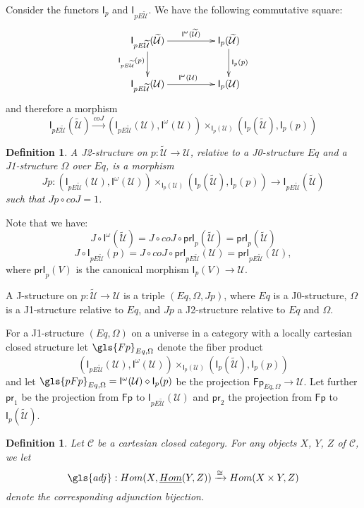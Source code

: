 \documentclass[12pt]{article}
\numberwithin{equation}{section}
\newenvironment{eq}{\begin{equation}}{\end{equation}}
\newtheorem{definition}[proposition]{Definition}
\newcommand{\sr}{\rightarrow}
\newcommand{\lr}{\longrightarrow}
\newcommand{\uu}{\underline}
\newcommand{\iHom}{\uu{Hom}}
\newcommand{\wt}{\widetilde}
\newcommand{\dd}{\diamond}
\newcommand{\C}{{\mathcal C}}  %
\newcommand{\id}{1}            %
\newcommand{\U}{\mathcal{U}}
\newcommand{\I}{\mathsf{I}}
\newcommand{\Fp}{\mathsf{Fp}}
\newcommand{\pr}{\mathsf{pr}}
\newcommand{\prI}{\mathsf{prI}}
\begin{document}
Consider the functors $\I_{p}$ and $\I_{pE\wt{\U}}$. We have the following
commutative square:
%
\begin{eq}\label{2010.sq1}
\begin{xy}
          \xymatrix@C=4pc{ \I_{pE\wt{\U}}(\wt{\U}) \ar[r]^-{\I^{\omega}(\wt{\U})}
            \ar[d]_{\I_{pE\wt{\U}}(p)} & \I_p(\wt{\U})
            \ar[d]^{\I_p(p)}\\ \I_{pE\wt{\U}}(\U) \ar[r]^{\I^{\omega}(\U)} & \I_p(\U) }
\end{xy}
\end{eq}%
%
and therefore a morphism
%
$$\I_{pE\wt{\U}}(\wt{\U}) \stackrel{coJ}{\lr} (\I_{pE\wt{\U}}(\U), \I^{\omega}(\U))
\times_{\I_p(\U)} (\I_p(\wt{\U}), \I_p(p))
$$
%
\begin{definition}
\label{2015.03.27.def6} A {\em J2-structure} on $p:\wt{\U}\sr \U$, relative to a J0-structure $Eq$
and a J1-structure $\Omega$ over $Eq$, is a morphism
%
$$ Jp:( \I_{pE\wt{\U}}(\U), \I^{\omega}(\U))\times_{\I_p(\U)} (\I_p(\wt{\U}), \I_p(p))\sr
\I_{pE\wt{\U}}(\wt{\U}) $$
%
such that $Jp\circ coJ = \id$.
\end{definition}
%
Note that we have:
%
\begin{eq}
\label{2015.04.04.eq1} J\circ \I^{\omega}(\wt{\U})=J\circ coJ\circ
\prI_p(\wt{\U})=\prI_{p}(\wt{\U})
\end{eq}%
%
\begin{eq}
\label{2015.04.04.eq2} J\circ \I_{pE\wt{\U}}(p)=J\circ coJ\circ
\prI_{pE\wt{\U}}(\U)=\prI_{pE\wt{\U}}(\U),
\end{eq}%
%
where $\prI_p(V)$ is the canonical morphism $\I_p(V)\sr \U$.

A J-structure on $p:\wt{\U}\sr \U$ is a triple $(Eq,\Omega,Jp)$, where $Eq$ is a J0-structure,
$\Omega$ is a J1-structure relative to $Eq$, and $Jp$ a J2-structure relative to
$Eq$ and $\Omega$.

For a J1-structure $(Eq,\Omega)$ on a universe in a category with a locally
cartesian closed structure let $\gls{Fp}_{Eq,\Omega}$ denote the fiber product
%
$$(\I_{pE\wt{\U}}(\U), \I^{\omega}(\U)) \times_{\I_p(\U)} (\I_p(\wt{\U}), \I_p(p))$$
%
and let $\gls{pFp}_{Eq,\Omega}=\I^{\omega}(\U)\dd \I_p(p)$ be the projection
$\Fp_{Eq,\Omega}\sr \U$. Let further $\pr_1$ be the projection from $\Fp$ to
$\I_{pE\wt{\U}}(\U)$ and $\pr_2$ the projection from $\Fp$ to $\I_p(\wt{\U})$.

\begin{definition}
  Let $\C$ be a cartesian closed category.  For any objects $X$, $Y$, $Z$ of $\C$, we let
  $$ \gls{adj} : Hom (X, \iHom(Y,Z) ) \xrightarrow \cong Hom(X \times Y, Z) $$
  denote the corresponding adjunction bijection.
\end{definition}
\end{document}
